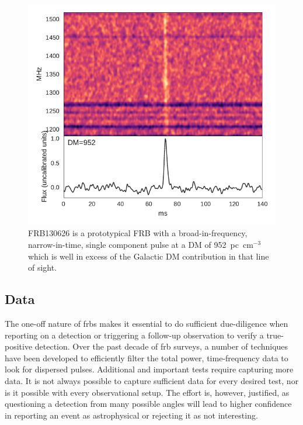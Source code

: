 \documentclass[a4paper,fleqn,usenatbib]{mnras}
\begin{document}
\begin{figure}
    \includegraphics[width=1.0\linewidth]{figures/FRB130626.pdf}
    \caption{FRB130626 is a prototypical FRB with a broad-in-frequency,
    narrow-in-time, single component pulse at a DM of 952~pc~cm$^{-3}$ which is
    well in excess of the Galactic DM contribution in that line of sight.
    }
    \label{fig:FRB130626}
\end{figure}

\subsection{Data}
\label{sec:detect_report}

The one-off nature of \glspl{frb} makes it essential to do sufficient
due-diligence when reporting on a detection or triggering a follow-up
observation to verify a true-positive detection. Over the past decade of
\gls{frb} surveys, a number of techniques have been developed to efficiently
filter the total power, time-frequency data to look for dispersed pulses.
Additional and important tests require capturing more data. It is not always
possible to capture sufficient data for every desired test, nor is it possible
with every observational setup.  The effort is, however, justified, as
questioning a detection from many possible angles will lead to higher confidence
in reporting an event as astrophysical or rejecting it as not interesting. 
\end{document}
